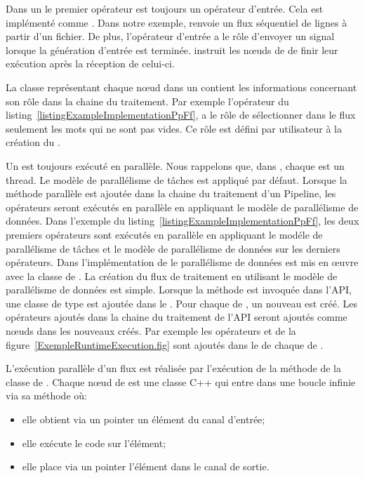 Dans un  le premier op\'erateur est toujours un op\'erateur d'entr\'ee. Cela est impl\'ement\'e comme . Dans notre exemple,  renvoie un flux s\'equentiel de lignes \`a partir d'un fichier. De plus, l'op\'erateur d'entr\'ee a le r\^ole d'envoyer un signal  lorsque la g\'en\'eration d'entr\'ee est termin\'ee.  instruit les nœuds  de  de finir leur ex\'ecution apr\`es la r\'eception de celui-ci.

La classe repr\'esentant chaque nœud dans un  contient les informations concernant son r\^ole dans la chaine du traitement. Par exemple l'op\'erateur  du listing~\ref{listingExampleImplementationPpFf}, a le r\^ole de s\'electionner dans le flux seulement les mots qui ne sont pas vides. Ce r\^ole est d\'efini par utilisateur \`a la cr\'eation du . 


Un  est toujours ex\'ecut\'e en parall\`ele. Nous rappelons que, dans , chaque  est un thread. Le mod\`ele de parall\'elisme de t\^aches est appliqu\'e par d\'efaut. Lorsque la m\'ethode parall\`ele est ajout\'ee dans la chaine du traitement d'un Pipeline, les op\'erateurs seront ex\'ecut\'es en parall\`ele en appliquant le mod\`ele de parall\'elisme de donn\'ees. Dans l'exemple du listing~\ref{listingExampleImplementationPpFf}, les deux premiers op\'erateurs sont ex\'ecut\'es en parall\`ele en appliquant le mod\'ele de parall\'elisme de t\^aches et le mod\`ele de parall\'elisme de donn\'ees sur les derniers op\'erateurs. Dans l'impl\'ementation de  le parall\'elisme de donn\'ees est mis en œuvre avec la classe  de . La cr\'eation du flux de traitement en utilisant le mod\`ele de parall\'elisme de donn\'ees est simple. Lorsque la m\'ethode  est invoqu\'ee dans l'API, une classe de type  est ajout\'ee dans le . Pour chaque  de , un nouveau  est cr\'e\'e. Les op\'erateurs ajout\'es dans la chaine du traitement de l'API seront ajout\'es comme nœuds dans les nouveaux  cr\'e\'es. Par exemple les op\'erateurs  et  de la figure~\ref{ExempleRuntimeExecution.fig} sont ajout\'es dans le  de chaque  de . 

L'ex\'ecution parall\`ele d'un flux est r\'ealis\'ee par l'ex\'ecution de la m\'ethode  de la classe  de . Chaque nœud  de  est une classe C++ qui entre dans une boucle infinie via sa m\'ethode  o\`u:
\begin{itemize}
	\item elle obtient via un pointer un \'el\'ement du canal d'entr\'ee;
	\item elle ex\'ecute le code sur l'\'el\'ement;
	\item elle place via un pointer l'\'el\'ement dans le canal de sortie.
\end{itemize}

